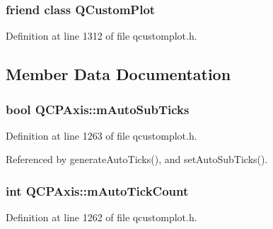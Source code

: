 \hypertarget{class_q_c_p_axis_a1cdf9df76adcfae45261690aa0ca2198}{}
\subsubsection[{Q\+Custom\+Plot}]{\setlength{\rightskip}{0pt plus 5cm}friend class {\bf Q\+Custom\+Plot}\hspace{0.3cm}{\ttfamily [friend]}}\label{class_q_c_p_axis_a1cdf9df76adcfae45261690aa0ca2198}


Definition at line 1312 of file qcustomplot.\+h.



\subsection{Member Data Documentation}
\hypertarget{class_q_c_p_axis_aaae980b0d193d959674e314dbb6c2c3b}{}
\subsubsection[{m\+Auto\+Sub\+Ticks}]{\setlength{\rightskip}{0pt plus 5cm}bool Q\+C\+P\+Axis\+::m\+Auto\+Sub\+Ticks\hspace{0.3cm}{\ttfamily [protected]}}\label{class_q_c_p_axis_aaae980b0d193d959674e314dbb6c2c3b}


Definition at line 1263 of file qcustomplot.\+h.



Referenced by generate\+Auto\+Ticks(), and set\+Auto\+Sub\+Ticks().

\hypertarget{class_q_c_p_axis_a499fbb67111e4b204738f6c1aa28d842}{}
\subsubsection[{m\+Auto\+Tick\+Count}]{\setlength{\rightskip}{0pt plus 5cm}int Q\+C\+P\+Axis\+::m\+Auto\+Tick\+Count\hspace{0.3cm}{\ttfamily [protected]}}\label{class_q_c_p_axis_a499fbb67111e4b204738f6c1aa28d842}


Definition at line 1262 of file qcustomplot.\+h.



